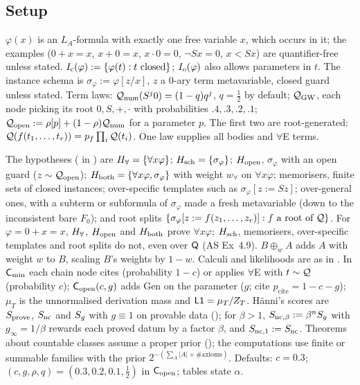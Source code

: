 \subsection{Setup}\label{sec:univ:setup}

\begin{definition}\label{def:univ:setup}
$\varphi(x)$ is an $L_A$-formula with exactly one free variable $x$, which occurs in it; the examples ($0+x=x$, $x+0=x$, $x\cdot0=0$, $\neg Sx=0$, $x<Sx$) are quantifier-free unless stated. $I_{\mathrm{c}}(\varphi):=\{\varphi(t):t\text{ closed}\}$; $I_{\mathrm{o}}(\varphi)$ also allows parameters in $t$. The instance schema is $\sigma_\varphi:=\varphi[z/x]$, $z$ a $0$-ary term metavariable, closed guard unless stated. Term laws: $\mathcal{Q}_{\mathrm{num}}(S^j0)=(1-q)q^j$, $q=\tfrac12$ by default; $\mathcal{Q}_{\mathrm{GW}}$, each node picking its root $0,S,+,\cdot$ with probabilities $.4,.3,.2,.1$; $\mathcal{Q}_{\mathrm{open}}:=\rho[p]+(1-\rho)\mathcal{Q}_{\mathrm{num}}$ for a parameter $p$. The first two are root-generated: $\mathcal{Q}(f(t_1,\dots,t_r))=p_f\prod_i\mathcal{Q}(t_i)$. One law supplies all bodies and $\forall$E terms.
\end{definition}

The hypotheses ( in ) are $H_{\forall}=\{\forall x\varphi\}$; $H_{\mathrm{sch}}=\{\sigma_\varphi\}$; $H_{\mathrm{open}}$, $\sigma_\varphi$ with an open guard ($z\sim\mathcal{Q}_{\mathrm{open}}$); $H_{\mathrm{both}}=\{\forall x\varphi,\sigma_\varphi\}$ with weight $w_\forall$ on $\forall x\varphi$; memorisers, finite sets of closed instances; over-specific templates such as $\sigma_\varphi[z:=Sz]$; over-general ones, with a subterm or subformula of $\sigma_\varphi$ made a fresh metavariable (down to the inconsistent bare $F_0$); and root splits $\{\sigma_\varphi[z:=f(z_1,\dots,z_r)]:f\text{ a root of }\mathcal{Q}\}$. For $\varphi=0+x=x$, $H_{\forall}$, $H_{\mathrm{open}}$ and $H_{\mathrm{both}}$ prove $\forall x\varphi$; $H_{\mathrm{sch}}$, memorisers, over-specific templates and root splits do not, even over $\mathsf{Q}$ (AS Ex~4.9). $B\oplus_wA$ adds $A$ with weight $w$ to $B$, scaling $B$'s weights by $1-w$. Calculi and likelihoods are as in . In $\mathsf{C}_{\min}$ each chain node cites (probability $1-c$) or applies $\forall$E with $t\sim\mathcal{Q}$ (probability $c$); $\mathsf{C}_{\mathrm{open}}(c,g)$ adds Gen on the parameter ($g$; cite $p_{\mathrm{cite}}=1-c-g$); $\mu_T$ is the unnormalised derivation mass and $\mathord{\mathsf{L1}}=\mu_T/Z_T$. H\"anni's scores are $S_{\mathrm{prove}}$, $S_{\mathrm{nc}}$ and $S_{g}$ with $g\equiv1$ on provable data (); for $\beta>1$, $S_{\mathrm{nc},\beta}:=\beta^nS_{g}$ with $g_\infty=1/\beta$ rewards each proved datum by a factor $\beta$, and $S_{\mathrm{nc},1}:=S_{\mathrm{nc}}$. Theorems about countable classes assume a proper prior (); the computations use finite or summable families with the prior $2^{-(\sum_A\lvert A\rvert+\#\text{axioms})}$. Defaults: $c=0.3$; $(c,g,\rho,q)=(0.3,0.2,0.1,\tfrac12)$ in $\mathsf{C}_{\mathrm{open}}$; tables state $\alpha$.

